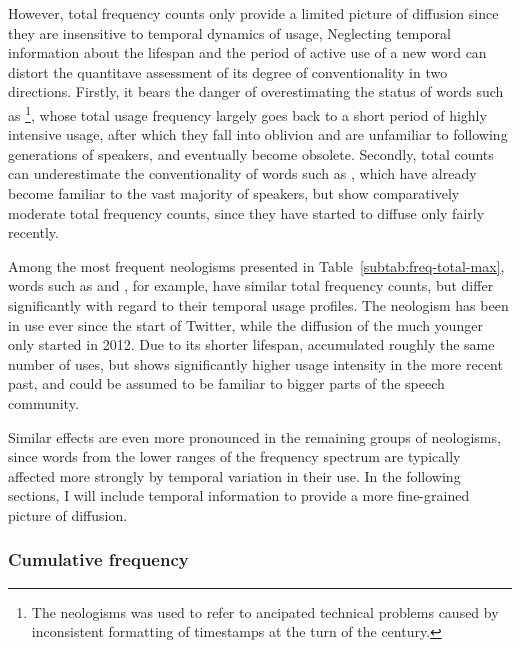 \documentclass[
  a4paper,
  abstract=on,
  captions=tableabove
  ]{scrartcl}
\begin{document}
      However, total frequency counts only provide a limited picture of diffusion since they are insensitive to temporal dynamics of usage, Neglecting temporal information about the lifespan and the period of active use of a new word can distort the quantitave assessment of its degree of conventionality in two directions. Firstly, it bears the danger of overestimating the status of words such as \footnote{The neologisms  was used to refer to ancipated technical problems caused by inconsistent formatting of timestamps at the turn of the century.}, whose total usage frequency largely goes back to a short period of highly intensive usage, after which they fall into oblivion and are unfamiliar to following generations of speakers, and eventually become obsolete. Secondly, total counts can underestimate the conventionality of words such as , which have already become familiar to the vast majority of speakers, but show comparatively moderate total frequency counts, since they have started to diffuse only fairly recently.

      Among the most frequent neologisms presented in Table~\ref{subtab:freq-total-max}, words such as  and , for example, have similar total frequency counts, but differ significantly with regard to their temporal usage profiles. The neologism  has been in use ever since the start of Twitter, while the diffusion of the much younger  only started in 2012. Due to its shorter lifespan,  accumulated roughly the same number of uses, but shows significantly higher usage intensity in the more recent past, and could be assumed to be familiar to bigger parts of the speech community.


      Similar effects are even more pronounced in the remaining groups of neologisms, since words from the lower ranges of the frequency spectrum are typically affected more strongly by temporal variation in their use. In the following sections, I will include temporal information to provide a more fine-grained picture of diffusion.


    \subsubsection{Cumulative frequency}

\end{document}
